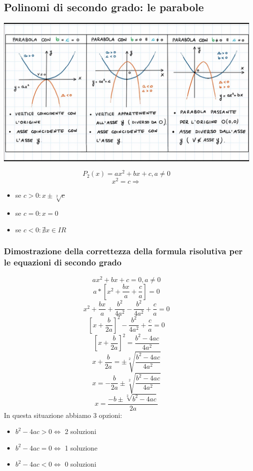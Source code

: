 \documentclass{report}
\begin{document}
    \subsection{Polinomi di secondo grado: le parabole}
        \begin{center}
            \includegraphics[width=\textwidth]{parabola.jpg}
        \end{center}
        $$ P_2(x) = ax^2 + bx + c, a \neq 0 $$
        $$ x^2 = c \Longrightarrow $$
        \begin{itemize}
            \item se $c > 0: x \pm \sqrt[2]{c} $
            \item se $c = 0: x = 0 $
            \item se $c < 0: \nexists x \in I\!R $
        \end{itemize}
        \newpage
        \subsubsection{Dimostrazione della correttezza della formula risolutiva per le equazioni di secondo grado}
            $$ ax^2 + bx + c = 0, a \neq 0 $$
            $$ a * \left[ x^2 + \frac{bx}{a} + \frac{c}{a} \right] = 0 $$
            $$ x^2 + \frac{bx}{a} + \frac{b^2}{4a^2} - \frac{b^2}{4a^2} + \frac{c}{a} = 0 $$
            $$ \left[ x + \frac{b}{2a} \right]^2 - \frac{b^2}{4a^2} + \frac{c}{a} = 0 $$
            $$ \left[ x + \frac{b}{2a} \right]^2 = \frac{b^2 - 4ac}{4a^2} $$
            $$ x + \frac{b}{2a} = \pm \sqrt[2]{\frac{b^2 - 4ac}{4a^2}} $$
            $$ x = -\frac{b}{2a} \pm \sqrt[2]{\frac{b^2 - 4ac}{4a^2}} $$
            $$ x = \frac{-b \pm \sqrt[2]{b^2 - 4ac}}{2a} $$
            In questa situazione abbiamo 3 opzioni:
            \begin{itemize}
                \item $b^2 - 4ac > 0 \Longleftrightarrow $ 2 soluzioni
                \item $b^2 -4ac = 0 \Longleftrightarrow $ 1 soluzione
                \item $b^2 - 4ac < 0 \Longleftrightarrow $ 0 soluzioni
            \end{itemize}
\end{document}
